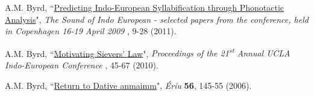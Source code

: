 \documentclass[paper=letter,fontsize=11pt]{scrartcl} %
\newcommand{\NewPart}[2]{\section*{\uppercase{#1} #2}}
\newcommand{\PaperEntry}[7]{
		\noindent #1, ``\href{#7}{#2}", \textit{#3} \textbf{#4}, #5 (#6).}
\begin{document}
\begin{etaremune}

\item \PaperEntry{A.M. Byrd}{Predicting Indo-European Syllabification through Phonotactic Analysis}{The Sound of Indo European - selected papers from the conference, held in Copenhagen 16-19 April 2009}{\hspace{-.35em}}{9-28}{2011}{http://rootsofeurope.ku.dk/english/activities/sound_of_indo-european/}

\item \PaperEntry{A.M. Byrd}{Motivating Sievers’ Law}{Proceedings of the 21\textsuperscript{st} Annual UCLA Indo-European Conference}{\hspace{-.35em}}{45-67}{2010}{https://www.academia.edu/1166462/Motivating_Sievers_Law} 

\item \PaperEntry{A.M. Byrd}{Return to Dative anmaimm}{Ériu}{56}{145-55}{2006}{https://bill.celt.dias.ie/vol4/displayObject.php?TreeID=3182} 


\end{etaremune}



\end{document}
